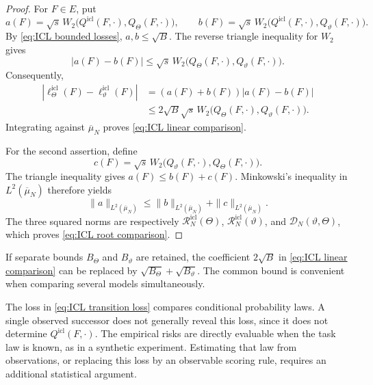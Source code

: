 \begin{proof}
For \(F\in E\), put
\[
a(F)=\sqrt s\,W_2\bigl(Q^{\mathrm{icl}}(F,\cdot),Q_\Theta(F,\cdot)\bigr),
\qquad
b(F)=\sqrt s\,W_2\bigl(Q^{\mathrm{icl}}(F,\cdot),Q_\vartheta(F,\cdot)\bigr).
\]
By \eqref{eq:ICL bounded losses}, \(a,b\leqslant\sqrt B\). The reverse triangle inequality for \(W_2\) gives
\[
|a(F)-b(F)|\leqslant\sqrt s\,
W_2\bigl(Q_\Theta(F,\cdot),Q_\vartheta(F,\cdot)\bigr).
\]
Consequently,
\begin{equation}
\label{eq:ICL pointwise comparison}
\begin{aligned}
|\ell_\Theta^{\mathrm{icl}}(F)-\ell_\vartheta^{\mathrm{icl}}(F)|
&=(a(F)+b(F))|a(F)-b(F)|\\
&\leqslant2\sqrt B\sqrt s\,
W_2\bigl(Q_\Theta(F,\cdot),Q_\vartheta(F,\cdot)\bigr).
\end{aligned}
\end{equation}
Integrating against \(\overline\mu_N\) proves \eqref{eq:ICL linear comparison}.

For the second assertion, define
\[
c(F)=\sqrt s\,W_2\bigl(Q_\vartheta(F,\cdot),Q_\Theta(F,\cdot)\bigr).
\]
The triangle inequality gives \(a(F)\leqslant b(F)+c(F)\). Minkowski's inequality in \(L^2(\overline\mu_N)\) therefore yields
\[
\|a\|_{L^2(\overline\mu_N)}
\leqslant\|b\|_{L^2(\overline\mu_N)}+\|c\|_{L^2(\overline\mu_N)}.
\]
The three squared norms are respectively \(\mathcal R_N^{\mathrm{icl}}(\Theta)\), \(\mathcal R_N^{\mathrm{icl}}(\vartheta)\), and \(\mathcal D_N(\vartheta,\Theta)\), which proves \eqref{eq:ICL root comparison}.
\end{proof}

If separate bounds \(B_\Theta\) and \(B_\vartheta\) are retained, the coefficient \(2\sqrt B\) in \eqref{eq:ICL linear comparison} can be replaced by \(\sqrt{B_\Theta}+\sqrt{B_\vartheta}\). The common bound is convenient when comparing several models simultaneously.

\begin{remark}
\label{rem:ICL oracle risk}
The loss in \eqref{eq:ICL transition loss} compares conditional probability laws. A single observed successor does not generally reveal this loss, since it does not determine \(Q^{\mathrm{icl}}(F,\cdot)\). The empirical risks are directly evaluable when the task law is known, as in a synthetic experiment. Estimating that law from observations, or replacing this loss by an observable scoring rule, requires an additional statistical argument.
\end{remark}

